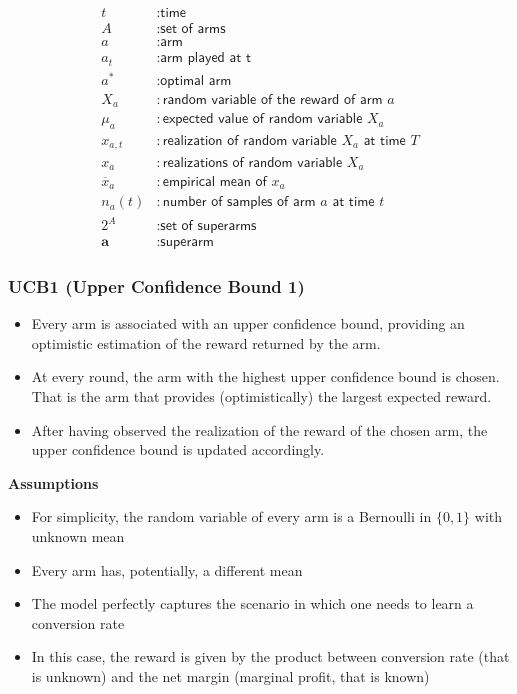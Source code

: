\documentclass[10pt,a4paper]{article}
\begin{document}
$$\begin{aligned} t &: \textsf{time} \\ A&: \textsf{set of arms} \\ a&: \textsf{arm} \\ a_t &: \textsf{arm played at t} \\ a^* &: \textsf{optimal arm} \\ X_a &: \textsf{random variable of the reward of arm } a \\ \mu_a &: \textsf{expected value of random variable } X_a \\ x_{a,t} &: \textsf{realization of random variable } X_a \textsf{ at time } T \\ x_a &: \textsf{realizations of random variable } X_a \\ \overline{x}_a &: \textsf{empirical mean of } x_a \\ n_a(t) &: \textsf{number of samples of arm } a \textsf{ at time } t \\ 2^A &: \textsf{set of superarms} \\ \mathbf{a} &: \textsf{superarm} \end{aligned}$$

\subsubsection{UCB1 (Upper Confidence Bound
1)}\label{ucb1-upper-confidence-bound-1}

\begin{itemize}
\item Every arm is associated with an upper confidence bound, providing an optimistic estimation of the reward returned by the arm.
\item At every round, the arm with the highest upper confidence bound is chosen. That is the arm that provides (optimistically) the largest expected reward.
\item After having observed the realization of the reward of the chosen arm, the upper confidence bound is updated accordingly.
\end{itemize}

\textbf{Assumptions}

\begin{itemize}

\item For simplicity, the random variable of every arm is a Bernoulli in $\{0, 1\}$ with unknown mean
\item Every arm has, potentially, a different mean
\item The model perfectly captures the scenario in which one needs to learn a conversion rate
\item In this case, the reward is given by the product between conversion rate (that is unknown) and the net margin (marginal profit, that is known)
\end{itemize}
\end{document}
